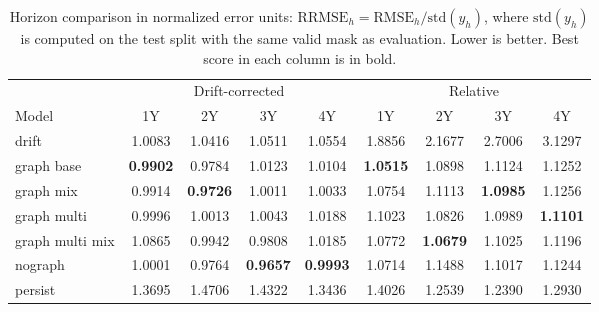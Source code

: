\documentclass[pdflatex,sn-basic]{sn-jnl}
\begin{document}
\begin{table}[H]
\centering
\caption{Horizon comparison in normalized error units: $\mathrm{RRMSE}_h=\mathrm{RMSE}_h/\mathrm{std}(y_h)$, where $\mathrm{std}(y_h)$ is computed on the test split with the same valid mask as evaluation. Lower is better. Best score in each column is in bold.}
\label{tab:appendix_rrmse_horizon_models}
\small
\setlength{\tabcolsep}{4pt}
\begin{tabular}{lcccccccc}
\toprule
& \multicolumn{4}{c}{Drift-corrected} & \multicolumn{4}{c}{Relative} \\
Model & 1Y & 2Y & 3Y & 4Y & 1Y & 2Y & 3Y & 4Y \\
\midrule
drift & 1.0083 & 1.0416 & 1.0511 & 1.0554 & 1.8856 & 2.1677 & 2.7006 & 3.1297 \\
graph base & \textbf{0.9902} & 0.9784 & 1.0123 & 1.0104 & \textbf{1.0515} & 1.0898 & 1.1124 & 1.1252 \\
graph mix & 0.9914 & \textbf{0.9726} & 1.0011 & 1.0033 & 1.0754 & 1.1113 & \textbf{1.0985} & 1.1256 \\
graph multi & 0.9996 & 1.0013 & 1.0043 & 1.0188 & 1.1023 & 1.0826 & 1.0989 & \textbf{1.1101} \\
graph multi mix & 1.0865 & 0.9942 & 0.9808 & 1.0185 & 1.0772 & \textbf{1.0679} & 1.1025 & 1.1196 \\
nograph & 1.0001 & 0.9764 & \textbf{0.9657} & \textbf{0.9993} & 1.0714 & 1.1488 & 1.1017 & 1.1244 \\
persist & 1.3695 & 1.4706 & 1.4322 & 1.3436 & 1.4026 & 1.2539 & 1.2390 & 1.2930 \\
\bottomrule
\end{tabular}
\end{table}
\end{document}
